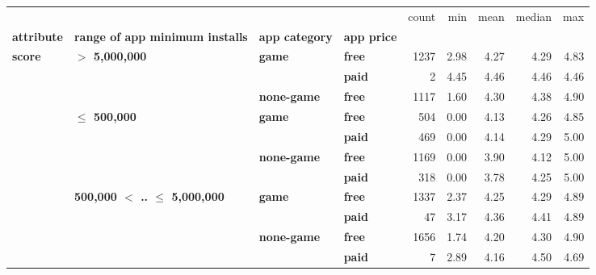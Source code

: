 \begin{tabular}{llll|rrrrr}
\toprule
      &                                 &           &      &  count &        min &       mean &     median &           max \\
\textbf{attribute} & \textbf{range of app minimum installs} & \textbf{app category} & \textbf{app price} &        &            &            &            &               \\
\midrule
\multirow{11}{*}{\textbf{score}} & \multirow{3}{*}{\textbf{$>$ 5,000,000}} & \multirow{2}{*}{\textbf{game}} & \textbf{free} &   1237 &       2.98 &       4.27 &       4.29 &          4.83 \\
      &                                 &           & \textbf{paid} &      2 &       4.45 &       4.46 &       4.46 &          4.46 \\
\cline{3-9}
      &                                 & \textbf{none-game} & \textbf{free} &   1117 &       1.60 &       4.30 &       4.38 &          4.90 \\
\cline{2-9}
      & \multirow{4}{*}{\textbf{$\leq$ 500,000}} & \multirow{2}{*}{\textbf{game}} & \textbf{free} &    504 &       0.00 &       4.13 &       4.26 &          4.85 \\
      &                                 &           & \textbf{paid} &    469 &       0.00 &       4.14 &       4.29 &          5.00 \\
\cline{3-9}
      &                                 & \multirow{2}{*}{\textbf{none-game}} & \textbf{free} &   1169 &       0.00 &       3.90 &       4.12 &          5.00 \\
      &                                 &           & \textbf{paid} &    318 &       0.00 &       3.78 &       4.25 &          5.00 \\
\cline{2-9}
\cline{3-9}
      & \multirow{4}{*}{\textbf{500,000 $<$ .. $\leq$ 5,000,000}} & \multirow{2}{*}{\textbf{game}} & \textbf{free} &   1337 &       2.37 &       4.25 &       4.29 &          4.89 \\
      &                                 &           & \textbf{paid} &     47 &       3.17 &       4.36 &       4.41 &          4.89 \\
\cline{3-9}
      &                                 & \multirow{2}{*}{\textbf{none-game}} & \textbf{free} &   1656 &       1.74 &       4.20 &       4.30 &          4.90 \\
      &                                 &           & \textbf{paid} &      7 &       2.89 &       4.16 &       4.50 &          4.69 \\

\end{tabular}

